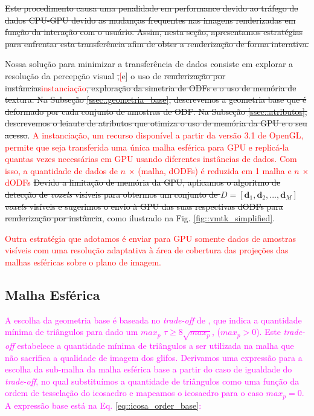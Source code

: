 \sout{Este procedimento causa uma penalidade em performance devido ao tráfego de dados CPU-GPU devido as mudanças frequentes nas imagens renderizadas em função da interação com o usuário. Assim, nesta seção, apresentamos estratégias para enfrentar esta transferência afim de obter a renderização de forma interativa.
}

Nossa solução para minimizar a transferência de dados consiste em explorar a resolução da percepção visual \sout{,}\textcolor{red}[e] o uso de \sout{renderização por instâncias}\textcolor{red}{instanciação}\sout{, exploração da simetria de ODFs e o uso de memória de textura. Na Subseção \ref{ssec::geometria_base}, descrevemos a geometria base que é deformado por cada conjunto de amostras de ODF. Na Subseção \ref{ssec::atributos}, descrevemos o leiaute de atributos que otimiza o uso de memória da GPU e o seu acesso}. \textcolor{red}{A instanciação, um recurso disponível a partir da versão 3.1 de OpenGL, permite que seja transferida uma única malha esférica para GPU e replicá-la quantas vezes necessárias em GPU usando diferentes instâncias de dados. Com isso, a quantidade de dados de $n$ $\times$ (malha, dODFs) é reduzida em 1 malha e $n$ $\times$ dODFs}
\sout{Devido a limitação de memória da GPU,  aplicamos o algoritmo de detecção de \textit{voxels} visíveis \cite{voltoline2021} para obtermos um conjunto de $D = [
\mathbf{d}_1,
\mathbf{d}_2, ..., 
\mathbf{d}_M
]$ \textit{voxels} visíveis e sugerimos o envio à GPU das suas respectivas dODFs para renderização por instância}, como ilustrado na Fig. \ref{fig::vmtk_simplified}.


\textcolor{red}{Outra estratégia que adotamos é enviar para GPU somente dados de amostras visíveis com uma resolução adaptativa à área de cobertura das projeções das malhas esféricas sobre o plano de imagem. }

\subsection{Malha Esférica}

\textcolor{magenta}{
A escolha da geometria base é baseada no \textit{trade-off} de , que indica a quantidade mínima de triângulos para dado um $max_p$
 $\tau \geq 8\sqrt{max_p}$, ($max_p > 0$). 
Este \textit{trade-off} estabelece a quantidade mínima de triângulos a ser utilizada na malha que não sacrifica a qualidade de imagem dos glifos. Derivamos uma expressão para a escolha da sub-malha da malha esférica base a partir do caso de igualdade do \textit{trade-off}, no qual substituímos a quantidade de triângulos como uma função da ordem de tesselação do icosaedro e mapeamos o icosaedro para o caso $max_p = 0$. A expressão base está na Eq. \ref{eq::icosa_order_base}:
}

